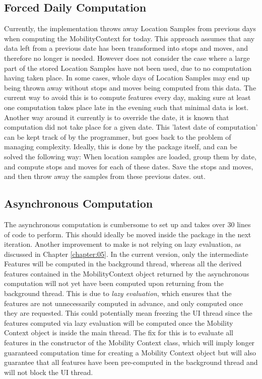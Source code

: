 \subsection{Forced Daily Computation}
Currently, the implementation throws away Location Samples from previous days when computing the MobilityContext for today. This approach assumes that any data left from a previous date has been transformed into stops and moves, and therefore no longer is needed. However does not consider the case where a large part of the stored Location Samples have not been used, due to no computation having taken place. In some cases, whole days of Location Samples may end up being thrown away without stops and moves being computed from this data. The current way to avoid this is to compute features every day, making sure at least one computation takes place late in the evening such that minimal data is lost. Another way around it currently is to override the date, it is known that computation did not take place for a given date. This 'latest date of computation' can be kept track of by the programmer, but goes back to the problem of managing complexity. Ideally, this is done by the package itself, and can be solved the following way:
When location samples are loaded, group them by date, and compute stops and moves for each of these dates. Save the stops and moves, and then throw away the samples from these previous dates. out.

\subsection{Asynchronous Computation}
The asynchronous computation is cumbersome to set up and takes over 30 lines of code to perform. This should ideally be moved inside the package in the next iteration. Another improvement to make is not relying on lazy evaluation, as discussed in Chapter \ref{chapter:05}. In the current version, only the intermediate Features will be computed in the background thread, whereas all the derived features contained in the MobilityContext object returned by the asynchronous computation will not yet have been computed upon returning from the background thread. This is due to \textit{lazy evaluation}, which ensures that the features are not unnecessarily computed in advance, and only computed once they are requested. This could potentially mean freezing the UI thread since the features computed via lazy evaluation will be computed once the Mobility Context object is inside the main thread. The fix for this is to evaluate all features in the constructor of the Mobility Context class, which will imply longer guaranteed computation time for creating a Mobility Context object but will also guarantee that all features have been pre-computed in the background thread and will not block the UI thread. 

